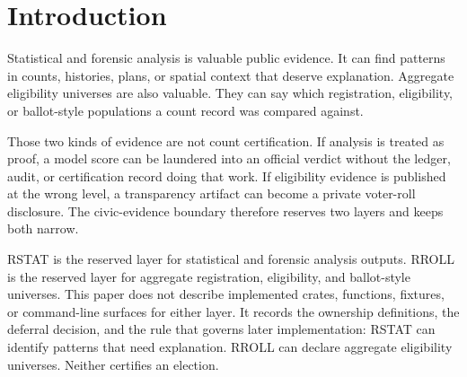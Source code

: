 \section{Introduction}

Statistical and forensic analysis is valuable public evidence. It can find
patterns in counts, histories, plans, or spatial context that deserve
explanation. Aggregate eligibility universes are also valuable. They can say
which registration, eligibility, or ballot-style populations a count record was
compared against.

Those two kinds of evidence are not count certification. If analysis is treated
as proof, a model score can be laundered into an official verdict without the
ledger, audit, or certification record doing that work. If eligibility evidence
is published at the wrong level, a transparency artifact can become a private
voter-roll disclosure. The civic-evidence boundary therefore reserves two
layers and keeps both narrow.

RSTAT is the reserved layer for statistical and forensic analysis outputs.
RROLL is the reserved layer for aggregate registration, eligibility, and
ballot-style universes. This paper does not describe implemented crates,
functions, fixtures, or command-line surfaces for either layer. It records the
ownership definitions, the deferral decision, and the rule that governs later
implementation: RSTAT can identify patterns that need explanation. RROLL can
declare aggregate eligibility universes. Neither certifies an election.
